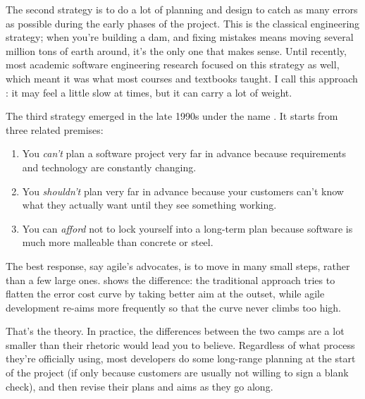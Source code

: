 \documentclass{report}
\begin{document}
The second strategy is to do a lot of planning and design to catch as
many errors as possible during the early phases of the project.  This
is the classical engineering strategy; when you're building a dam, and
fixing mistakes means moving several million tons of earth around,
it's the only one that makes sense.  Until recently, most academic
software engineering research focused on this strategy as well, which
meant it was what most courses and textbooks taught.  I call this
approach : it may feel a little slow at
times, but it can carry a lot of weight.

The third strategy emerged in the late 1990s under the name
.  It starts from three related premises:

\begin{enumerate}

  \item You \emph{can't} plan a software project very far in advance
  because requirements and technology are constantly changing.

  \item You \emph{shouldn't} plan very far in advance because your
  customers can't know what they actually want until they see
  something working.

  \item You can \emph{afford} not to lock yourself into a long-term
  plan because software is much more malleable than concrete or steel.

\end{enumerate}

The best response, say agile's advocates, is to move in many small
steps, rather than a few large ones.   shows the
difference: the traditional approach tries to flatten the error cost
curve by taking better aim at the outset, while agile development
re-aims more frequently so that the curve never climbs too high.

\begin{figure}
\end{figure}

That's the theory.  In practice, the differences between the two camps
are a lot smaller than their rhetoric would lead you to believe.
Regardless of what process they're officially using, most developers
do some long-range planning at the start of the project (if only
because customers are usually not willing to sign a blank check), and
then revise their plans and aims as they go along.
\end{document}
